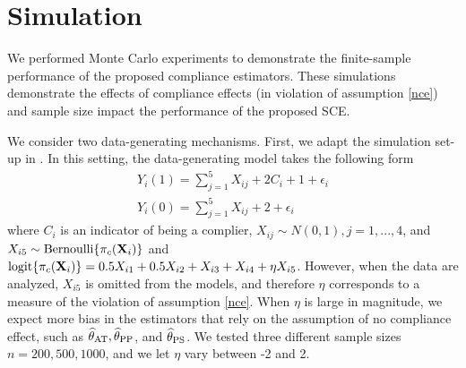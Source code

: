 \documentclass{article}
\def\spp{_{\text{PP}}}
\def\sat{_{\text{AT}}}
\def\sps{_{\text{PS}}}
\begin{document}




\section{Simulation}

We performed Monte Carlo experiments to demonstrate the finite-sample performance of the proposed compliance estimators. These simulations demonstrate the effects of compliance effects (in violation of assumption \ref{nce}) and sample size impact the performance of the proposed SCE. 

We consider two data-generating mechanisms. First, we adapt the simulation set-up in \cite{Ding2017}. In this setting, the data-generating model takes the following form
\begin{align}
    Y_i(1) = \sum_{j=1}^5 X_{ij} + 2C_i + 1 + \epsilon_i\\
    Y_i(0) = \sum_{j=1}^5 X_{ij} + 2 + \epsilon_i
\end{align}
where $C_i$ is an indicator of being a complier, $X_{ij} \sim N(0,1), j = 1, ..., 4$, and $X_{i5} \sim \text{Bernoulli}\{\pi_c({\bf X}_i)\}$ and $\mbox{logit}\{\pi_c({\bf X}_i)\} = 0.5X_{i1} + 0.5X_{i2} + X_{i3} + X_{i4} + \eta X_{i5}$.
However, when the data are analyzed, $X_{i5}$ is omitted from the models, and therefore $\eta$ corresponds to a measure of the violation of assumption \ref{nce}. When $\eta$ is large in magnitude, we expect more bias in the estimators that rely on the assumption of no compliance effect, such as $\thetahat\sat, \thetahat\spp$, and $\thetahat\sps$. We tested three different sample sizes $n = 200, 500, 1000$, and we let $\eta$ vary between -2 and 2.
\end{document}

